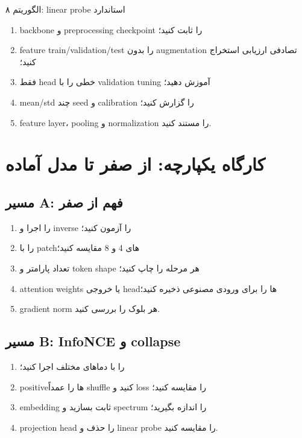 \documentclass[12pt,openany,oneside]{book}
\begin{document}
\begin{algorithmbox}{الگوریتم ۸: linear probe استاندارد}
\begin{enumerate}
\item backbone و preprocessing checkpoint را ثابت کنید؛
\item feature train/validation/test را بدون augmentation تصادفی ارزیابی استخراج کنید؛
\item فقط head خطی را با validation tuning آموزش دهید؛
\item mean/std چند seed و calibration را گزارش کنید؛
\item feature layer، pooling و normalization را مستند کنید.
\end{enumerate}
\end{algorithmbox}

\section{کارگاه یکپارچه: از صفر تا مدل آماده}
\subsection{مسیر A: فهم از صفر}
\begin{enumerate}
\item {} را اجرا و inverse را آزمون کنید؛
\item {} را با patchهای 4 و 8 مقایسه کنید؛
\item تعداد پارامتر و token shape هر مرحله را چاپ کنید؛
\item attention weights یا خروجی headها را برای ورودی مصنوعی ذخیره کنید؛
\item gradient norm هر بلوک را بررسی کنید.
\end{enumerate}

\subsection{مسیر B: InfoNCE و collapse}
\begin{enumerate}
\item {} را با دماهای مختلف اجرا کنید؛
\item positiveها را عمداً shuffle کنید و loss را مقایسه کنید؛
\item embedding ثابت بسازید و spectrum را اندازه بگیرید؛
\item projection head را حذف و linear probe را مقایسه کنید.
\end{enumerate}
\end{document}
